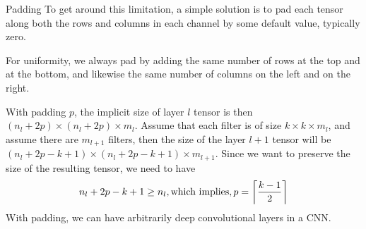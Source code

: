 %
\begin{frame}{Padding}
To get around
this limitation, a simple solution is to pad each tensor
along both the rows and columns in each channel by some default value, 
typically zero. 

\medskip

For
uniformity, we always pad by adding the same number of rows at the top
and at
the bottom, and likewise the same number of columns on the left and on the right.


\medskip

With padding $p$, the implicit size of layer $l$ tensor is then $(n_l+2p) \times
(n_l+2p) \times m_l$. Assume that each filter is of size $k \times k \times
m_l$, and assume there are $m_{l+1}$ filters, then the size of the layer $l+1$ tensor will be
$(n_l+2p -k +1) \times (n_l+2p -k +1) \times m_{l+1}$. Since we want to
preserve the size of the resulting tensor, we need to have
\begin{align*}
    n_l+2p -k +1  \ge n_l, \text{which implies}, 
    p = \left\lceil \frac{k-1}{2} \right\rceil
\end{align*}
With padding, we can have arbitrarily
deep convolutional layers in a CNN.
\end{frame}
%
%
